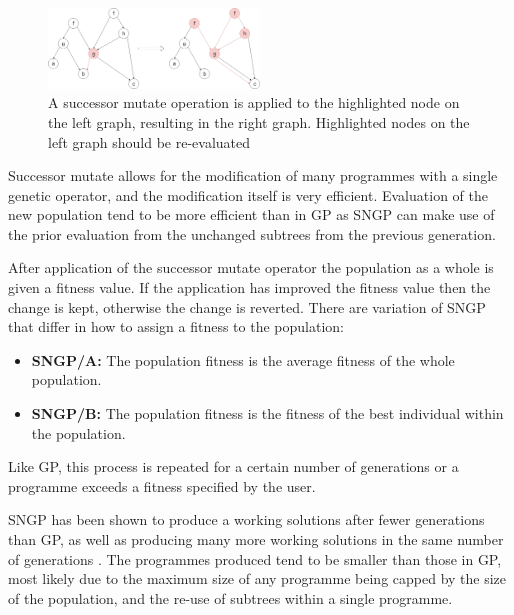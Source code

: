 \documentclass{article}
\begin{document}
        \begin{figure}[h]
            \centering
            \includegraphics[width=0.5\textwidth]{10_successor_mutate}
            \caption{A successor mutate operation is applied to the highlighted node on the left graph, resulting in the right graph. Highlighted nodes on the left graph should be re-evaluated}
            \label{fig:successor_mut}
        \end{figure}
        
        Successor mutate allows for the modification of many programmes with a single genetic operator, and the modification itself is very efficient. Evaluation of the new population tend to be more efficient than in GP as SNGP can make use of the prior evaluation from the unchanged subtrees from the previous generation.
        
        After application of the successor mutate operator the population as a whole is given a fitness value. If the application has improved the fitness value then the change is kept, otherwise the change is reverted. There are variation of SNGP that differ in how to assign a fitness to the population:
        
        \begin{itemize}
            \item \textbf{SNGP/A:} The population fitness is the average fitness of the whole population.
            
            \item \textbf{SNGP/B:} The population fitness is the fitness of the best individual within the population.
        \end{itemize} 
        
        Like GP, this process is repeated for a certain number of generations or a programme exceeds a fitness specified by the user.
        
        SNGP has been shown to produce a working solutions after fewer generations than GP, as well as producing many more working solutions in the same number of generations \cite{jackson_new_2012}. The programmes produced tend to be smaller than those in GP, most likely due to the maximum size of any programme being capped by the size of the population, and the re-use of subtrees within a single programme.
        
\end{document}
